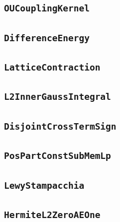 \documentclass[11pt]{amsart}
\theoremstyle{definition}
\begin{document}
\subsection{\texorpdfstring{\texttt{OUCouplingKernel}}{OUCouplingKernel}}\label{node:OUCouplingKernel}


\subsection{\texorpdfstring{\texttt{DifferenceEnergy}}{DifferenceEnergy}}\label{node:DifferenceEnergy}


\subsection{\texorpdfstring{\texttt{LatticeContraction}}{LatticeContraction}}\label{node:LatticeContraction}


\subsection{\texorpdfstring{\texttt{L2InnerGaussIntegral}}{L2InnerGaussIntegral}}\label{node:L2InnerGaussIntegral}


\subsection{\texorpdfstring{\texttt{DisjointCrossTermSign}}{DisjointCrossTermSign}}\label{node:DisjointCrossTermSign}


\subsection{\texorpdfstring{\texttt{PosPartConstSubMemLp}}{PosPartConstSubMemLp}}\label{node:PosPartConstSubMemLp}


\subsection{\texorpdfstring{\texttt{LewyStampacchia}}{LewyStampacchia}}\label{node:LewyStampacchia}


\subsection{\texorpdfstring{\texttt{HermiteL2ZeroAEOne}}{HermiteL2ZeroAEOne}}\label{node:HermiteL2ZeroAEOne}

\end{document}
